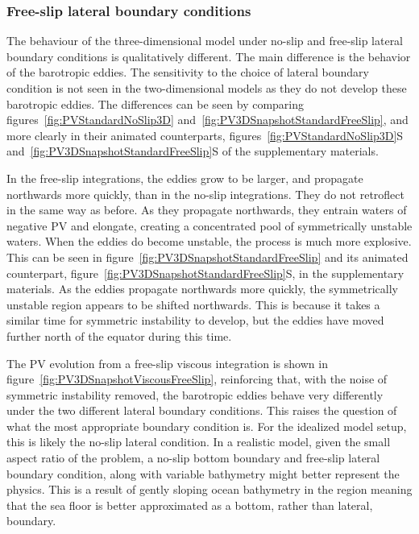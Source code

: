     \subsubsection{Free-slip lateral boundary conditions}
    The behaviour of the three-dimensional model under no-slip and free-slip lateral boundary conditions is qualitatively different. The main difference is the behavior of the barotropic eddies. The sensitivity to the choice of lateral boundary condition is not seen in the two-dimensional models as they do not develop these barotropic eddies. The differences can be seen by comparing figures~\ref{fig:PVStandardNoSlip3D} and~\ref{fig:PV3DSnapshotStandardFreeSlip}, and more clearly in their animated counterparts, figures~\ref{fig:PVStandardNoSlip3D}S and~\ref{fig:PV3DSnapshotStandardFreeSlip}S of the supplementary materials. 
    
    In the free-slip integrations, the eddies grow to be larger, and propagate northwards more quickly, than in the no-slip integrations. They do not retroflect in the same way as before. As they propagate northwards, they entrain waters of negative PV and elongate, creating a concentrated pool of symmetrically unstable waters. When the eddies do become unstable, the process is much more explosive. This can be seen in figure~\ref{fig:PV3DSnapshotStandardFreeSlip} and its animated counterpart, figure~\ref{fig:PV3DSnapshotStandardFreeSlip}S, in the supplementary materials. As the eddies propagate northwards more quickly, the symmetrically unstable region appears to be shifted northwards. This is because it takes a similar time for symmetric instability to develop, but the eddies have moved further north of the equator during this time.
    
    The PV evolution from a free-slip viscous integration is shown in figure~\ref{fig:PV3DSnapshotViscousFreeSlip}, reinforcing that, with the noise of symmetric instability removed, the barotropic eddies behave very differently under the two different lateral boundary conditions. This raises the question of what the most appropriate boundary condition is. For the idealized model setup, this is likely the no-slip lateral condition. In a realistic model, given the small aspect ratio of the problem, a no-slip bottom boundary and free-slip lateral boundary condition, along with variable bathymetry might better represent the physics. This is a result of gently sloping ocean bathymetry in the region meaning that the sea floor is better approximated as a bottom, rather than lateral, boundary.

